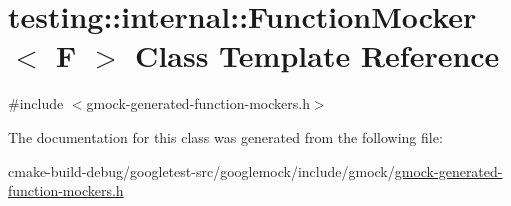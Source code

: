 \hypertarget{classtesting_1_1internal_1_1FunctionMocker}{}\section{testing\+::internal\+::Function\+Mocker$<$ F $>$ Class Template Reference}
\label{classtesting_1_1internal_1_1FunctionMocker}


{\ttfamily \#include $<$gmock-\/generated-\/function-\/mockers.\+h$>$}



The documentation for this class was generated from the following file\+:\begin{DoxyCompactItemize}
\item 
cmake-\/build-\/debug/googletest-\/src/googlemock/include/gmock/\mbox{\hyperlink{gmock-generated-function-mockers_8h}{gmock-\/generated-\/function-\/mockers.\+h}}\end{DoxyCompactItemize}
